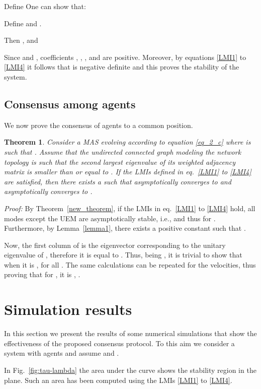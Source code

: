 \documentclass[conference]{IEEEtran}
\newtheorem{theorem}{\textbf{Theorem}}
\begin{document}
Define  One can show that:

Define  and .

Then ,  and


Since   and , coefficients , , , and  are positive. Moreover, by equations \eqref{LMI1} to \eqref{LMI4} it follows that  is negative definite and this proves the stability of the system. \hfill 






\subsection{Consensus among agents}

We now prove the consensus of agents to a common position.

\begin{theorem}
Consider a MAS evolving according to equation \eqref{eq_2_c} where  is such that . Assume that the undirected connected graph  modeling the network topology is such that the second largest eigenvalue of its weighted adjacency matrix is smaller than or equal to . If the LMIs defined in eq.~\eqref{LMI1} to \eqref{LMI4} are satisfied, then there exists a  such that  asymptotically converges to  and  asymptotically converges to .
\end{theorem}

{\em Proof:} By Theorem~\ref{new_theorem}, if the LMIs in eq.~\eqref{LMI1} to \eqref{LMI4} hold, all modes except the UEM are asymptotically stable, i.e.,  and thus  for . Furthermore, by Lemma~\ref{lemma1}, there exists a positive constant  such that .

Now, the first column of  is the eigenvector corresponding to the unitary eigenvalue of , therefore it is equal to . Thus, being , it is trivial to show that when  it is , for all .
The same calculations can be repeated for the velocities, thus proving that for , it is , . \hfill 




\section{Simulation results}\label{sim_res}

In this section we present the results of some numerical simulations that show the effectiveness of the proposed consensus protocol.
To this aim we consider a system with  agents and assume  and .

In Fig.~\ref{fig:tau-lambda} the area under the curve shows the stability region in the  plane. Such an area has been computed using the LMIs \eqref{LMI1} to \eqref{LMI4}.
\end{document}
